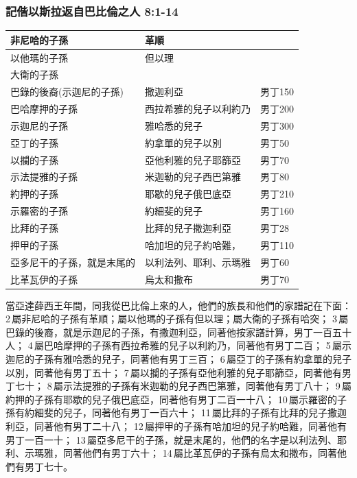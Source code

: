 \subsubsection{記偕以斯拉返自巴比倫之人 8:1-14}
\begin{table}[H]
\centering 
\begin{tabular}{p{5cm}|p{4.5cm}|p{2cm}}\hline\hline
非尼哈的子孫&革順& \\\hline
以他瑪的子孫&但以理& \\\hline
大衛的子孫& & \\\hline
巴錄的後裔(示迦尼的子孫) &撒迦利亞  &男丁150\\\hline
巴哈摩押的子孫& 西拉希雅的兒子以利約乃  &男丁200\\\hline
示迦尼的子孫& 雅哈悉的兒子  &男丁300\\\hline
亞丁的子孫& 約拿單的兒子以別  &男丁50\\\hline
以攔的子孫& 亞他利雅的兒子耶篩亞  &男丁70\\\hline
示法提雅的子孫& 米迦勒的兒子西巴第雅  &男丁80\\\hline
約押的子孫& 耶歇的兒子俄巴底亞  &男丁210\\\hline
示羅密的子孫& 約細斐的兒子  &男丁160\\\hline
比拜的子孫& 比拜的兒子撒迦利亞 &男丁28\\\hline
押甲的子孫&哈加坦的兒子約哈難，&男丁110\\\hline
亞多尼干的子孫，就是末尾的&以利法列、耶利、示瑪雅&男丁60\\\hline
比革瓦伊的子孫&烏太和撒布&男丁70\\\hline
\end{tabular}
\end{table}
當亞達薛西王年間，同我從巴比倫上來的人，他們的族長和他們的家譜記在下面： 2 屬非尼哈的子孫有革順；屬以他瑪的子孫有但以理；屬大衛的子孫有哈突； 3 屬巴錄的後裔，就是示迦尼的子孫，有撒迦利亞，同著他按家譜計算，男丁一百五十人； 4 屬巴哈摩押的子孫有西拉希雅的兒子以利約乃，同著他有男丁二百； 5 屬示迦尼的子孫有雅哈悉的兒子，同著他有男丁三百； 6 屬亞丁的子孫有約拿單的兒子以別，同著他有男丁五十； 7 屬以攔的子孫有亞他利雅的兒子耶篩亞，同著他有男丁七十； 8 屬示法提雅的子孫有米迦勒的兒子西巴第雅，同著他有男丁八十； 9 屬約押的子孫有耶歇的兒子俄巴底亞，同著他有男丁二百一十八； 10 屬示羅密的子孫有約細斐的兒子，同著他有男丁一百六十； 11 屬比拜的子孫有比拜的兒子撒迦利亞，同著他有男丁二十八； 12 屬押甲的子孫有哈加坦的兒子約哈難，同著他有男丁一百一十； 13 屬亞多尼干的子孫，就是末尾的，他們的名字是以利法列、耶利、示瑪雅，同著他們有男丁六十； 14 屬比革瓦伊的子孫有烏太和撒布，同著他們有男丁七十。

